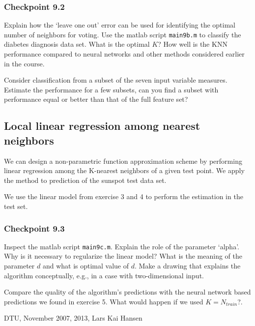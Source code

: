 \documentclass[12pt]{article}    %
\begin{document}
\subsubsection*{Checkpoint 9.2}
Explain how the `leave one out' error can be used for identifying the optimal number
of neighbors for voting. Use the matlab script {\tt main9b.m}
to classify the diabetes diagnosis data set.
What is the optimal $K$? How well is the KNN performance compared
to neural networks and other methods considered earlier in the course.

Consider classification from a subset of the seven input variable measures.
Estimate the performance for a few subsets, can you find a subset
with performance equal or better than that of the full feature set?

\subsection*{Local linear regression among nearest neighbors}

We can design a non-parametric function approximation scheme by
performing linear regression among the K-nearest neighbors of a given test point. We apply the method
to prediction of the sunspot test data set.

We use the linear model from exercise 3 and 4 to perform the estimation
in the test set.

\subsubsection*{Checkpoint 9.3}
Inspect the matlab script {\tt main9c.m}. Explain the role of the parameter `alpha'.
Why is it necessary to regularize the linear model?
What is the meaning of the parameter $d$ and what is optimal value of $d$.
Make a drawing that explains the algorithm conceptually, e.g.,  in a case with two-dimensional input.

Compare the  quality of the algorithm's predictions with
the neural network based predictions we found in exercise 5. What would happen if we used $K = N_{train}$?.




\vspace{2cm}
\noindent DTU, November 2007, 2013, Lars Kai Hansen
\end{document}
